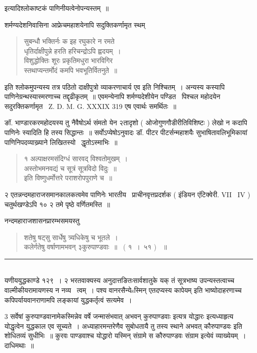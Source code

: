 \documentclass[11pt, openany]{book}
\begin{document}
\begin{multicols}{2}
\noindent
इत्यादिश्लोकाष्टकं पाणिनीयत्वेनोपन्यस्तम्~॥ 

शर्मण्यदेशनिवासिना आफ्रेचमहाशयेनापि सदुक्तिकर्णामृत स्थम् \textendash\

\begin{quote}
{\qt सुबन्धौ भक्तिर्नः क इह रघुकारे न रमते\\
धृतिर्दाक्षीपुन्ने हरति हरिचन्द्रोऽपि ह्वदयम्~।\\
विशुद्धोक्तिः शूरः प्रकृतिमधुरा भारविगिर \textendash\ \\
स्तथाप्यन्तर्मोदं कमपि भवभूतिर्वितनुते~॥}
\end{quote}

इति श्लोकमुपन्यस्य {\qt तत्र पठितो दाक्षीपुत्रो व्याकरणाचार्य एव} इति निश्चितम्~। अन्यस्य कस्यापि पाणिनेग्रन्थस्यास्मरणाच्च तद्दृढीकृतम्~॥ एवमन्येनापि शर्मण्यदेशीयेन पण्डित \textendash\ पिश्चल महोदयेन सदुरक्तिकर्णामृत \textendash\ Z. D. M. G. XXXIX 319 एष एवार्थः समर्थितः~॥

ङॉ. भाण्डारकरमहोदयस्य तु नैवैषोऽर्थ संमतो येन २तादृशो ( ओजोगुणगौडीरीतिविशिष्टः ) लेखो न कदापि पाणिनेः स्यादिति हि तस्य सिद्धान्तः~॥ सर्वोऽप्येषोऽनुवादः डॉ. पीटर पीटर्सन्महाशयैः सुभाषितावलिभूमिकायां पाणिनिपदव्याख्र्याने लिखितस्यो \textendash\ द्धृतोऽस्माभिः~॥

\begin{quote}
{\qt १ अल्पाक्षरमसंदिग्धं सारवद् विश्वतोमुखम्~।\\
अस्तोभमनवद्यं च सूत्रं सूत्रविदो विदुः~॥ \\
इति विष्णुधर्मोत्तरे पराशरोपपुराणे च~॥}
\end{quote}

२ एतन्नन्दमहाराजसमानकालकत्वमेव पाणिनेः भारतीय \textendash\ प्राचीनवृत्तप्रदर्शक ( इंडियन एंटिक्वेरी. VII \textendash\ IV ) चतुर्थखण्डेऽपि १० २ तमे पृष्ठे वर्णितमस्ति~॥

नन्दमहाराजशासनप्रारम्भसमयस्तु \textendash\ 

\begin{quote}
{\qt शतेषु षट्सु सार्धेषु त्र्यधिकेषु च भूतले~।\\
कलेर्गतेषु वर्षाणामभवन् ३कुरुपाण्डवाः~॥~ ( १~।~५१ ) ~॥}
\end{quote}

\noindent
\rule{1\linewidth}{0.5pt}\\

\noindent
यणीययुद्धकाण्डे १२९~। २ भरतवाक्यस्य अनुदात्तङितः{\qt सार्वशातुके यक्} तं सूत्रभाष्य उपन्यस्तत्वाच्च वाल्मीकीयरामायणस्य न नव्य \textendash\ त्वम्~। {\qt पश्य वानरसैन्येsस्मिन् एतदप्यस्य कापेयम्} इति भाष्योदाहरणाच्च कपिपर्यायवानराणामपि लङ्कायां युद्धकर्तृत्वं सत्यमेव~।

3 सर्वेषां कुरुपाण्डवानामेकस्मिन्नेव वर्षे जन्मासंभवात् अभवन् कुरुपाण्डवाः इत्यत्र {\qt योद्धारः} इत्यध्याहृत्य योद्धृत्वेन युद्धकाल एव सूच्यते~। अध्याहारमन्तरेणैव सुबोधतायै तु तस्य स्थाने {\qt अभवत् कौरुपाण्डवः} इति शोधितव्यं सुधीभिः~॥ कुरवः पाण्डवाश्च योद्धारो यस्मिन् संग्रामे स कौरुपाण्डवः संग्राम इत्येवं व्याख्येयम्~। दाधिमथाः~॥
\end{multicols}
\end{document}
